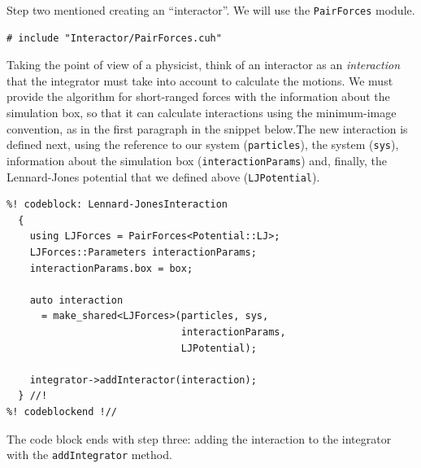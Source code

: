 Step two mentioned creating an ``interactor''. We will use the
\texttt{PairForces} module.
\begin{lstlisting}
# include "Interactor/PairForces.cuh"
\end{lstlisting}

Taking the point of view of a physicist, think of an interactor as an 
\textit{interaction} that the integrator must take into account to calculate the 
motions. We must provide the algorithm for short-ranged forces with the 
information about the simulation box, so that it can calculate interactions 
using the minimum-image convention, as in the first paragraph in the snippet 
below.The new interaction is defined next, using the reference to our system 
(\texttt{particles}), the system (\texttt{sys}), information about the 
simulation box (\texttt{interactionParams}) and, finally, the Lennard-Jones 
potential that we defined above (\texttt{LJPotential}).

\begin{lstlisting}
%! codeblock: Lennard-JonesInteraction
  {
    using LJForces = PairForces<Potential::LJ>;
    LJForces::Parameters interactionParams;
    interactionParams.box = box;

    auto interaction
      = make_shared<LJForces>(particles, sys,
                              interactionParams,
                              LJPotential);

    integrator->addInteractor(interaction);
  } //!
%! codeblockend !//
\end{lstlisting}
The code block ends with step three: adding the interaction to the integrator
with the \texttt{addIntegrator} method.

